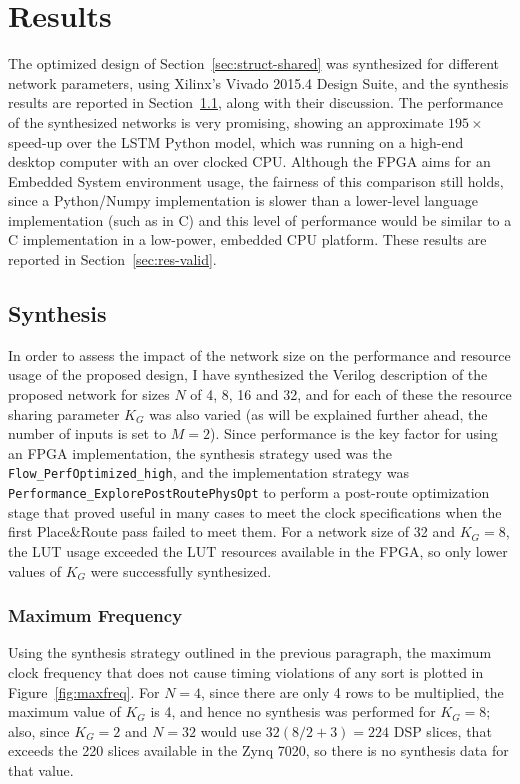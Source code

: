 \chapter{Results}\label{chap:results}
The optimized design of Section~\ref{sec:struct-shared} was synthesized for different network parameters, using Xilinx's Vivado 2015.4 Design Suite, and the synthesis results are reported in Section~\ref{sec:res-synth}, along with their discussion. The performance of the synthesized networks is very promising, showing an approximate $195\times$ speed-up over the LSTM Python model, which was running on a high-end desktop computer with an over clocked CPU. Although the FPGA aims for an Embedded System environment usage, the fairness of this comparison still holds, since a Python/Numpy implementation is slower than a lower-level language implementation (such as in C) and this level of performance would be similar to a C implementation in a low-power, embedded CPU platform. These results are reported in Section~\ref{sec:res-valid}. 

\section{Synthesis}\label{sec:res-synth}
In order to assess the impact of the network size on the performance and resource usage of the proposed design, I have synthesized the Verilog description of the proposed network for sizes $N$ of 4, 8, 16 and 32, and for each of these the resource sharing parameter $K_G$ was also varied (as will be explained further ahead, the number of inputs is set to $M=2$). Since performance is the key factor for using an FPGA implementation, the synthesis strategy used was the \verb+Flow_PerfOptimized_high+, and the implementation strategy was \verb+Performance_ExplorePostRoutePhysOpt+ to perform a post-route optimization stage that proved useful in many cases to meet the clock specifications when the first Place\&Route pass failed to meet them. For a network size of 32 and $K_G=8$, the LUT usage exceeded the LUT resources available in the FPGA, so only lower values of $K_G$ were successfully synthesized.
 
\subsection{Maximum Frequency}\label{sec:res-synth-maxfreq}
Using the synthesis strategy outlined in the previous paragraph, the maximum clock frequency that does not cause timing violations of any sort is plotted in Figure~\ref{fig:maxfreq}. For $N=4$, since there are only 4 rows to be multiplied, the maximum value of $K_G$ is 4, and hence no synthesis was performed for $K_G = 8$; also, since $K_G = 2$ and $N=32$ would use $32(8/2+3) = 224$ DSP slices, that exceeds the 220 slices available in the Zynq 7020, so there is no synthesis data for that value.

